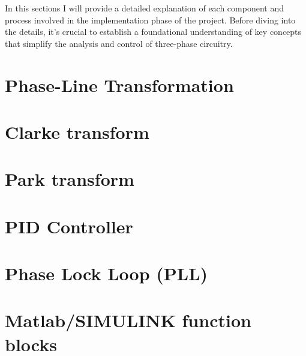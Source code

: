 In this sections I will provide a detailed explanation of each component and
process involved in the implementation phase of the project. Before diving into
the details, it's crucial to establish a foundational understanding of key
concepts that simplify the analysis and control of three-phase circuitry.

\section{Phase-Line Transformation}

\section{Clarke transform}

\section{Park transform}

\section{PID Controller}

\section{Phase Lock Loop (PLL)}

\section{Matlab/SIMULINK function blocks}

